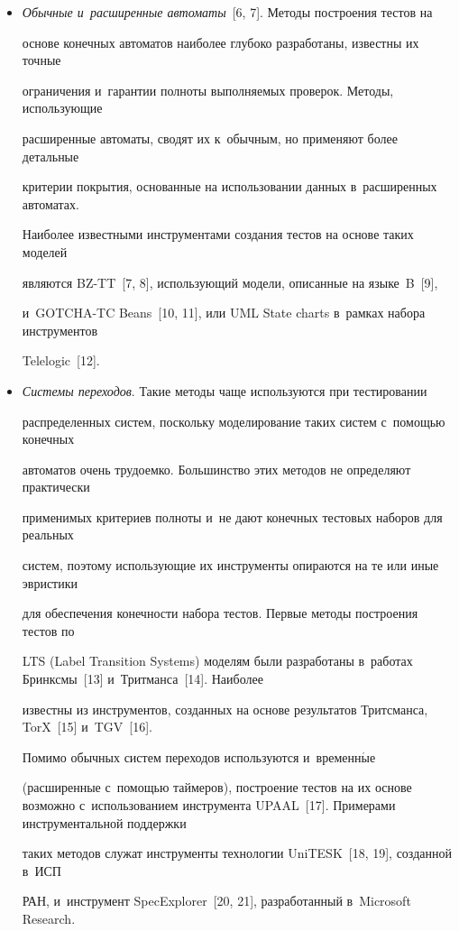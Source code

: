    \begin{itemize}


\item \textit{Обычные и~расширенные автоматы}~[6, 7]. Методы построения тестов на


основе конечных автоматов наиболее глубоко разработаны, известны их точные


ограничения и~гарантии полноты выполняемых проверок. Методы, использующие


расширенные автоматы, сводят их к~обычным, но применяют более детальные


критерии покрытия, основанные на использовании данных в~расширенных автоматах.


Наиболее известными инструментами создания тестов на основе таких моделей


являются BZ-TT~[7, 8], использующий модели, описанные на языке~B~[9],


и~GOTCHA-TC Beans~[10, 11], или UML State charts в~рамках набора инструментов


Telelogic~[12].


\item \textit{Системы переходов}. Такие методы чаще используются при тестировании


распределенных систем, поскольку моделирование таких систем с~помощью конечных


автоматов очень трудоемко. Большинство этих методов не определяют практически


применимых критериев полноты и~не дают конечных тестовых наборов для реальных


систем, поэтому использующие их инструменты опираются на те или иные эвристики


для обеспечения конечности набора тестов. Первые методы построения тестов по


LTS (Label Transition Systems) моделям были разработаны в~работах Бринксмы~[13] и~Тритманса~[14]. Наиболее


известны из инструментов, созданных на основе результатов Тритсманса, TorX~[15] и~TGV~[16].


Помимо обычных систем переходов используются и~временн$\acute{\mbox{ы}}$е


(расширенные с~помощью таймеров), построение тестов на их основе возможно с~использованием инструмента UPAAL~[17]. Примерами инструментальной поддержки


таких методов служат инструменты технологии UniTESK~[18, 19], созданной в~ИСП


РАН, и~инструмент SpecExplorer~[20, 21], разработанный в~Microsoft Research.


   \end{itemize}





